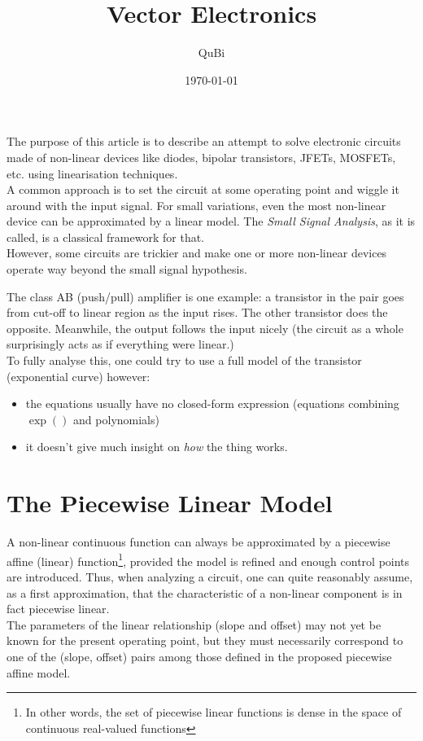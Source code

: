 \documentclass[10pt]{article}
\title{Vector Electronics}
\author{QuBi}
\date{\today}
\begin{document}
\maketitle

The purpose of this article is to describe an attempt to solve electronic circuits made of non-linear devices like diodes, bipolar transistors, JFETs, MOSFETs, etc. using linearisation techniques.\\

A common approach is to set the circuit at some operating point and wiggle it around with the input signal.
For small variations, even the most non-linear device can be approximated by a linear model.
The \textit{Small Signal Analysis}, as it is called, is a classical framework for that.\\

However, some circuits are trickier and make one or more non-linear devices operate way beyond the small signal hypothesis.

The class AB (push/pull) amplifier is one example: a transistor in the pair goes from cut-off to linear region as the input rises. 
The other transistor does the opposite. Meanwhile, the output follows the input nicely (the circuit as a whole surprisingly acts as if everything were linear.)\\

To fully analyse this, one could try to use a full model of the transistor (exponential curve) however:
\begin{itemize}
	\item the equations usually have no closed-form expression (equations combining $\exp()$ and polynomials) 
	\item it doesn't give much insight on \textit{how} the thing works.
\end{itemize}

\section*{The Piecewise Linear Model}
A non-linear continuous function can always be approximated by a piecewise affine (linear) function\footnote{In other words, the set of piecewise linear functions is dense in the space of continuous real-valued functions}, 
provided the model is refined and enough control points are introduced.
Thus, when analyzing a circuit, one can quite reasonably assume, as a first approximation, that the characteristic of a non-linear component is in fact piecewise linear. \\
The parameters of the linear relationship (slope and offset) may not yet be known for the present operating point, but they must necessarily correspond to one of the (slope, offset) pairs among those defined in the proposed piecewise affine model.\\
\end{document}
